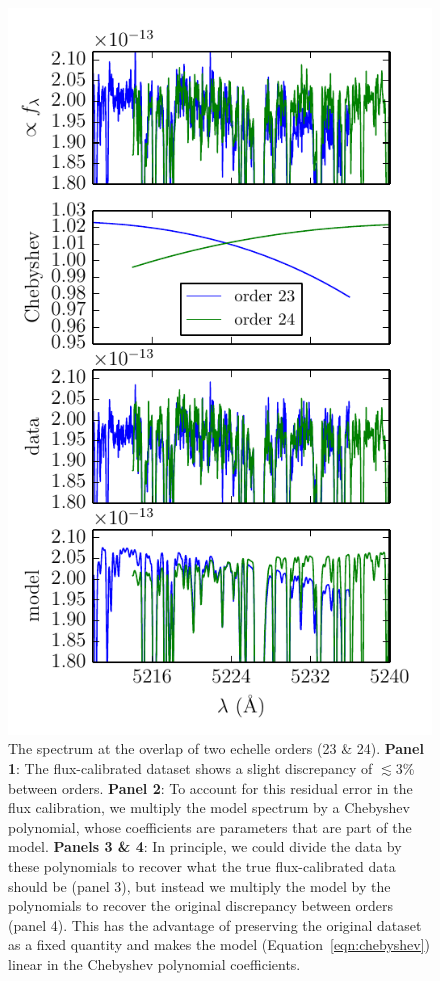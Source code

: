 \documentclass[iop,floatfix]{emulateapj}
\begin{document}
\begin{figure}[!htb]
\begin{center}
  \includegraphics{figs/chebyshev.pdf}
  \caption{The spectrum at the overlap of two echelle orders (23 \& 24). \textbf{Panel 1}: The flux-calibrated dataset shows a slight discrepancy of $\lesssim 3$\% between orders. \textbf{Panel 2}: To account for this residual error in the flux calibration, we multiply the model spectrum by a Chebyshev polynomial, whose coefficients are parameters that are part of the model. \textbf{Panels 3 \& 4}: In principle, we could divide the data by these polynomials to recover what the true flux-calibrated data should be (panel 3), but instead we multiply the model by the polynomials to recover the original discrepancy between orders (panel 4). This has the advantage of preserving the original dataset as a fixed quantity and makes the model (Equation~\ref{eqn:chebyshev}) linear in the Chebyshev polynomial coefficients.}
\label{fig:chebyshev}
\end{center}
\end{figure}
\end{document}
